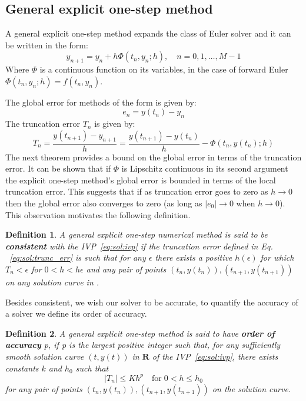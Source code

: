 \documentclass[11pt]{report}
\newtheorem{definition}{Definition}[section]
\begin{document}
    \subsection{General explicit one-step method}
    A general explicit one-step method expands the class of Euler solver and it can be written in the form:
    \begin{equation*}
        y_{n+1} = y_n + h \Phi(t_n, y_n ; h),\quad n=0,1,\dots, M-1
    \end{equation*}
    Where $\Phi$ is a continuous function on its variables, in the case of forward Euler $\Phi(t_n, y_n;h)= f(t_n,y_n).$

    The global error for methods of the form is given by:
    \begin{equation*}
        e_n = y(t_n) - y_n
    \end{equation*}
    The truncation error $T_n$ is given by:
    \begin{equation}
        \label{eq:sol:trunc_err}
        T_n = \frac{ y(t_{n+1}) - y_{n+1} }{ h } = \frac{ y(t_{n+1}) - y(t_n) }{ h } - \Phi(t_n, y(t_n);h)
    \end{equation}
    The next theorem provides a bound on the global error in terms of the truncation
    error.
    It can be shown that if $\Phi$ is Lipschitz continuous in its second argument the explicit one-step method's global
    error is bounded in terms of the local truncation error.
    This suggests that if as truncation error goes to zero as $h \to 0$ then the global error also converges to zero
    (as long as $|e_0| \to 0$ when $h \to 0$).
    This observation motivates the following definition.

    \begin{definition}
        A general explicit one-step numerical method is said to be \textbf{consistent} with the IVP~\eqref{eq:sol:ivp}
        if the truncation error defined in Eq. ~\ref{eq:sol:trunc_err} is such that for any $\epsilon$
        there exists a positive $h(\epsilon)$ for which $T_n < \epsilon$ for $0 < h< h{\epsilon}$ and any pair of points
        $(t_n, y(t_n)), (t_{n+1}, y(t_{n+1}) ) $ on any solution curve in .
    \end{definition}

    Besides consistent, we wish our solver to be accurate, to quantify the accuracy of a solver we define its order of
    accuracy.

    \begin{definition}
        A general explicit one-step method is said to have \textbf{order of accuracy} p, if p is the largest positive
        integer such that, for any sufficiently smooth solution curve $(t, y(t))$ in $\pmb{R}$ of the
        IVP~\eqref{eq:sol:ivp}, there exists constants $k$ and $h_0$ such that
        \begin{equation*}
            |T_n| \leq Kh^p \quad \text{for} \; 0<h\leq h_0
        \end{equation*}
        for any pair of points $(t_n, y(t_n)), (t_{n+1}, y(t_{n+1}) ) $ on the solution curve.
    \end{definition}
\end{document}

